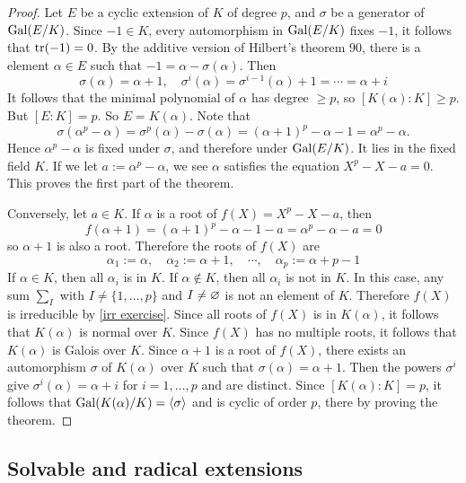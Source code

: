 \begin{proof}
Let $E$ be a cyclic extension of $K$ of degree $p$, and $\sigma$ be a generator of $\mathrm{Gal}(E/K)$. Since $-1\in K$, every automorphism in $\mathrm{Gal}(E/K)$ fixes $-1$, it follows that $\mathrm{tr}(-1)=0$. By the additive version of Hilbert's theorem $90$, there is a element $\alpha\in E$ such that $-1=\alpha-\sigma(\alpha)$. Then
\[\sigma(\alpha)=\alpha+1,\quad\sigma^i(\alpha)=\sigma^{i-1}(\alpha)+1=\cdots=\alpha+i\]
It follows that the minimal polynomial of $\alpha$ has degree $\geq p$, so $[K(\alpha):K]\geq p$. But $[E:K]=p$. So $E=K(\alpha)$. Note that
\[\sigma(\alpha^p-\alpha)=\sigma^p(\alpha)-\sigma(\alpha)=(\alpha+1)^p-\alpha-1=\alpha^p-\alpha.\]
Hence $\alpha^p-\alpha$ is fixed under $\sigma$, and therefore under $\mathrm{Gal}(E/K)$. It lies in the fixed field $K$. If we let $a:=\alpha^p-\alpha$, we see $\alpha$ satisfies the equation $X^p-X-a=0$. This proves the first part of the theorem.\par
Conversely, let $a\in K$. If $\alpha$ is a root of $f(X)=X^p-X-a$, then
\[f(\alpha+1)=(\alpha+1)^p-\alpha-1-a=\alpha^p-\alpha-a=0\]
so $\alpha+1$ is also a root. Therefore the roots of $f(X)$ are 
\[\alpha_1:=\alpha,\quad\alpha_2:=\alpha+1,\quad\cdots,\quad\alpha_p:=\alpha+p-1\]
If $\alpha\in K$, then all $\alpha_i$ is in $K$. If $\alpha\notin K$, then all $\alpha_i$ is not in $K$. In this case, any sum $\sum_I$ with $I\neq\{1,\dots,p\}$ and $I\neq\varnothing$ is not an element of $K$. Therefore $f(X)$ is irreducible by \cref{irr exercise}. Since all roots of $f(X)$ is in $K(\alpha)$, it follows that $K(\alpha)$ is normal over $K$. Since $f(X)$ has no multiple roots, it follows that $K(\alpha)$ is Galois over $K$. Since $\alpha+1$ is a root of $f(X)$, there exists an automorphism $\sigma$ of $K(\alpha)$ over $K$ such that $\sigma(\alpha)=\alpha+1$. Then the powers $\sigma^i$ give $\sigma^i(\alpha)=\alpha+i$ for $i=1,\dots,p$ and are distinct. Since $[K(\alpha):K]=p$, it follows that $\mathrm{Gal}(K(\alpha)/K)=\langle\sigma\rangle$ and is cyclic of order $p$, there by proving the theorem.
\end{proof}
\subsection{Solvable and radical extensions}
